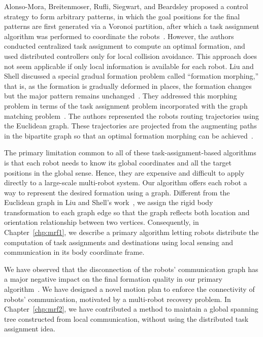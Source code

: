Alonso-Mora, Breitenmoser, Rufli, Siegwart, and Beardsley proposed a control
strategy to form arbitrary patterns, in which the goal positions for the final
patterns are first generated via a Voronoi partition, after which a task
assignment algorithm was performed to coordinate the robots~\cite{AloBreRufSieBea11}. 
%
However, the authors conducted centralized task assignment to compute an optimal formation, and used distributed controllers only for local collision avoidance.  
%
This approach does not seem applicable if only local information is available for each robot.  
%
Liu and Shell discussed a special gradual formation problem called ``formation morphing,'' 
that is, as the formation is gradually deformed in places, the formation changes but the major
pattern remains unchanged~\cite{LiuShe12}. 
%
They addressed this morphing problem in terms of the task assignment problem incorporated with the graph matching problem~\cite{Lov86}. 
%
The authors represented the robots routing trajectories using the Euclidean graph.  
%
These trajectories are projected from the augmenting paths in the bipartite graph 
so that an optimal formation morphing can be achieved~\cite{LiuShe12}.

The primary limitation common to all of these task-assignment-based algorithms
is that each robot needs to know its global coordinates and all the target
positions in the global sense. 
%
Hence, they are expensive and difficult to apply directly to a large-scale multi-robot system. 
%
Our algorithm offers each robot a way to represent the desired formation using a graph.
%
Different from the Euclidean graph in Liu and Shell's work~\cite{LiuShe12},
we assign the rigid body transformation to each graph edge so that the graph
reflects both location and orientation relationship between two vertices. 
%
Consequently, in Chapter~\ref{chp:mrf1}, we describe a primary algorithm letting robots 
distribute the computation of task assignments and destinations using local sensing
and communication in its body coordinate frame.


We have observed that the disconnection of the robots' communication
graph has a major negative impact on the final formation quality in our
primary algorithm~\cite{SonOKa14}. 
%
We have designed a novel motion plan to enforce the connectivity of robots' communication,
motivated by a multi-robot recovery problem.
%
In Chapter~\ref{chp:mrf2}, we have contributed a method to maintain a global
spanning tree constructed from local communication, 
without using the distributed task assignment idea.


